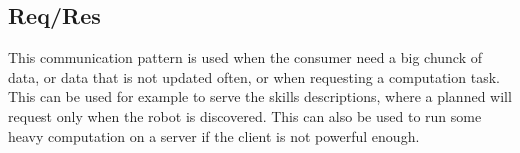 \documentclass[conference]{IEEEtran}
\begin{document}
\subsection{Req/Res}

This communication pattern is used when the consumer need a big chunck of data, or data that is not updated often, or when requesting a computation task.
This can be used for example to serve the skills descriptions, where a planned will request only when the robot is discovered.
This can also be used to run some heavy computation on a server if the client is not powerful enough.


\end{document}
